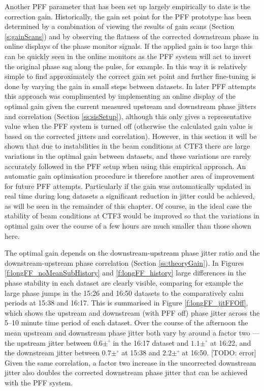 Another PFF parameter that has been set up largely empirically to date is the correction gain. Historically, the gain set point for the PFF prototype has been determined by a combination of viewing the results of gain scans (Section \ref{s:gainScans}) and by observing the flatness of the corrected downstream phase in online displays of the phase monitor signals. If the applied gain is too large this can be quickly seen in the online monitors as the PFF system will act to invert the original phase sag along the pulse, for example. In this way it is relatively simple to find approximately the correct gain set point and further fine-tuning is done by varying the gain in small steps between datasets. In later PFF attempts this approach was complimented by implementing an online display of the optimal gain given the current measured upstream and downstream phase jitters and correlation (Section \ref{ss:sisSetup}), although this only gives a representative value when the PFF system is turned off (otherwise the calculated gain value is based on the corrected jitters and correlation). However, in this section it will be shown that due to instabilities in the beam conditions at CTF3 there are large variations in the optimal gain between datasets, and these variations are rarely accurately followed in the PFF setup when using this empirical approach. An automatic gain optimisation procedure is therefore another area of improvement for future PFF attempts. Particularly if the gain was automatically updated in real time during long datasets a significant reduction in jitter could be achieved, as will be seen in the remainder of this chapter. Of course, in the ideal case the stability of beam conditions at CTF3 would be improved so that the variations in optimal gain over the course of a few hours are much smaller than those shown here.

The optimal gain depends on the downstream-upstream phase jitter ratio and the downstream-upstream phase correlation (Section \ref{ss:theoryGain}). In Figures \ref{f:longFF_noMeanSubHistory} and \ref{f:longFF_history} large differences in the phase stability in each dataset are clearly visible, comparing for example the large phase jumps in the 15:26 and 16:50 datasets to the comparatively calm periods at 15:38 and 16:17. This is summarised in Figure \ref{f:longFF_jitFFOff}, which shows the upstream and downstream (with PFF off) phase jitter across the 5--10 minute time period of each dataset. Over the course of the afternoon the mean upstream and downstream phase jitter both vary by around a factor two --- the upstream jitter between \(0.6\pm^\circ\) in the 16:17 dataset and \(1.1\pm^\circ\) at 16:22, and the downstream jitter between \(0.7\pm^\circ\) at 15:38 and \(2.2\pm^\circ\) at 16:50. [TODO: error] Given the same correlation, a factor two increase in the uncorrected downstream jitter also doubles the corrected downstream phase jitter that can be achieved with the PFF system.

